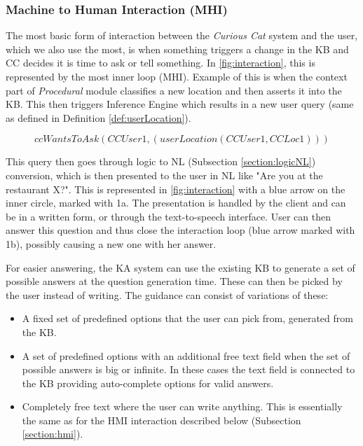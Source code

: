 \subsubsection{Machine to Human Interaction (MHI)}
\label{section:mhi}
The most basic form of interaction between the \emph{Curious Cat} system and
the user, which we also use the most, is when something triggers a change in the KB and CC decides it is time to ask or tell something. In 
\autoref{fig:interaction}, this is represented by the most inner loop (MHI). 
Example of this is when the context part of \emph{Procedural} module classifies
a new location and then asserts it into the KB. This then triggers Inference 
Engine which results in a new user query (same as defined in Definition
\ref{def:userLocation}).

\begin{equation*}
	\label{eq:ccWantsLoc}
	ccWantsToAsk(CCUser1, (userLocation(CCUser1,CCLoc1)))
\end{equation*}

This query then goes through logic to NL (Subsection \ref{section:logicNL}) 
conversion, which is then
presented to the user in NL like "Are you at the restaurant X?".
This is represented in \autoref{fig:interaction} with a blue arrow on the
inner circle, marked with 1a. The presentation is handled by the client and 
can be in a written form, or through the text-to-speech interface. User can then answer this question and thus close the interaction loop (blue arrow marked with
1b), possibly causing a new one with her answer. 

For easier answering, the KA system can use the existing KB to generate a set
of possible answers at the question generation time. These can then be picked by
the user instead of writing. The guidance can consist of variations of these:
\begin{itemize}
	\item A fixed set of predefined options that the user can pick from, generated
	from the KB.
	\item A set of predefined options with an additional free text field when
	the set of possible answers is big or infinite. In these cases the text field
	is connected to the KB providing auto-complete options for valid answers.
	\item Completely free text where the user can write anything. This is essentially 	the same as for the HMI interaction described below (Subsection \ref{section:hmi}).
\end{itemize}

